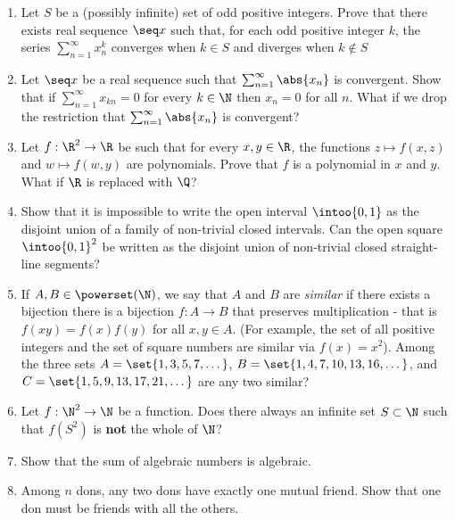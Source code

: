 \documentclass[12pt,a4paper]{article}
\begin{document}
\begin{enumerate}
 \item
  Let \(S\) be a (possibly infinite) set of odd positive integers. Prove that
  there exists real sequence \(\seq x\) such that, for each odd positive integer
  \(k\), the series \(\sum_{n = 1}^\infty x_n^k\) converges when \(k \in S\) and
  diverges when \(k \notin S\)
 \item
  Let \(\seq x\) be a real sequence such that \(\sum_{n = 1}^\infty \abs{x_n}\)
  is convergent. Show that if \(\sum_{n = 1}^\infty x_{kn} = 0\) for every
  \(k \in \N\) then \(x_n = 0\) for all \(n\). What if we drop the restriction
  that \(\sum_{n = 1}^\infty \abs{x_n}\) is convergent?
 \item
  Let \(f: \R^2 \to \R\) be such that for every \(x, y \in \R\), the functions
  \(z \mapsto f(x, z)\) and \(w \mapsto f(w, y)\) are polynomials. Prove that
  \(f\) is a polynomial in \(x\) and \(y\). What if \(\R\) is replaced with
  \(\Q\)?
 \item
  Show that it is impossible to write the open interval \(\intoo{0, 1}\) as the
  disjoint union of a family of non-trivial closed intervals. Can the open
  square \(\intoo{0, 1}^2\) be written as the disjoint union of non-trivial
  closed straight-line segments?
 \item
  If \(A, B \in \powerset(\N)\), we say that \(A\) and \(B\) are \emph{similar}
  if there exists a bijection there is a bijection \(f: A \to B\) that preserves
  multiplication - that is \(f(xy) = f(x)f(y)\) for all \(x, y \in A\). (For
  example, the set of all positive integers and the set of square numbers are
  similar via \(f(x) = x^2\)). Among the three sets
  \(A = \set{1, 3, 5, 7, \dotsc}\), \(B = \set{1, 4, 7, 10, 13, 16, \dotsc}\),
  and \(C = \set{1, 5, 9, 13, 17, 21, \dotsc}\) are any two similar?
 \item
  Let \(f : \N^2 \to \N\) be a function. Does there always an infinite set
  \(S \subset \N\) such that \(f(S^2)\) is \textbf{not} the whole of \(\N\)?
 \item
  Show that the sum of algebraic numbers is algebraic.
 \item
  Among \(n\) dons, any two dons have exactly one mutual friend. Show that one
  don must be friends with all the others.
\end{enumerate}
\end{document}
